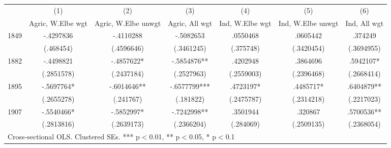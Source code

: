 \begin{adjustbox}{max width=\textwidth}
\begin{tabular}{lcccccc}
\toprule
 & (1) & (2) & (3) & (4) & (5) & (6) \\
 & Agric, W.Elbe wgt & Agric, W.Elbe unwgt & Agric, All wgt & Ind, W.Elbe wgt & Ind, W.Elbe unwgt & Ind, All wgt \\
\midrule
1849 & -.4297836 & -.4110288 & -.5082653 & .0550468 & .0605442 & .374249 \\
 & (.468454) & (.4596646) & (.3461245) & (.375748) & (.3420454) & (.3694955) \\[0.3em]
1882 & -.4498821 & -.4857622* & -.5854876** & .4202948 & .3864696 & .5942107* \\
 & (.2851578) & (.2437184) & (.2527963) & (.2559003) & (.2396468) & (.2668414) \\[0.3em]
1895 & -.5697764* & -.6014646** & -.6577799*** & .4723197* & .4485717* & .6404879** \\
 & (.2655278) & (.241767) & (.181822) & (.2475787) & (.2314218) & (.2217023) \\[0.3em]
1907 & -.5540466* & -.5852997* & -.7242998** & .3501944 & .320867 & .5700536** \\
 & (.2813816) & (.2639173) & (.2366204) & (.284069) & (.2509135) & (.2368054) \\[0.3em]
\bottomrule
\multicolumn{7}{l}{\footnotesize Cross-sectional OLS. Clustered SEs. *** p$<$0.01, ** p$<$0.05, * p$<$0.1} \\
\end{tabular}
\end{adjustbox}
